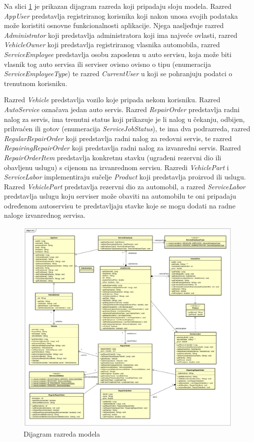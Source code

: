 		Na slici \ref{fig:classdiagram} je prikazan dijagram razreda koji pripadaju sloju modela. Razred \textit{AppUser} predstavlja registriranog korisnika koji nakon unosa svojih podataka može koristiti osnovne funkcionalnosti aplikacije. Njega nasljeđuje razred \textit{Administrator} koji predstavlja administratora koji ima najveće ovlasti, razred \textit{VehicleOwner} koji predstavlja registriranog vlasnika automobila, razred \textit{ServiceEmployee} predstavlja osobu zaposlenu u auto servisu, koja može biti vlasnik tog auto servisa ili serviser ovisno ovisno o tipu (enumeracija \textit{ServiceEmployeeType}) te razred \textit{CurrentUser} u koji se pohranjuju podatci o trenutnom korisniku. 
		
		Razred \textit{Vehicle} predstavlja vozilo koje pripada nekom korisniku. Razred \textit{AutoService} označava jedan auto servis. Razred \textit{RepairOrder} predstavlja radni nalog za servis, ima trenutni status koji prikazuje je li nalog u čekanju, odbijen, prihvaćen ili gotov (enumeracija \textit{ServiceJobStatus}), te ima dva podrazreda, razred \textit{RegularRepairOrder} koji predstavlja radni nalog za redovni servis, te razred \textit{RepairingRepairOrder} koji predstavlja radni nalog za izvanredni servis. Razred \textit{RepairOrderItem} predstavlja konkretnu stavku (ugrađeni rezervni dio ili obavljenu uslugu) s cijenom na izvanrednom servisu. Razredi \textit{VehiclePart} i \textit{ServiceLabor} implementiraju sučelje \textit{Product} koji predstavlja proizvod ili uslugu. Razred \textit{VehiclePart} predstavlja rezervni dio za automobil, a razred \textit{ServiceLabor} predstavlja uslugu koju serviser može obaviti na automobilu te oni pripadaju određenom autoservisu te predstavljaju stavke koje se mogu dodati na radne naloge izvanrednog servisa.
		
		\begin{figure}[H]
			\centering
			\includegraphics[width=1.0\linewidth]{dijagrami/class_diagram}
			\caption{Dijagram razreda modela}
			\label{fig:classdiagram}
		\end{figure}
	

